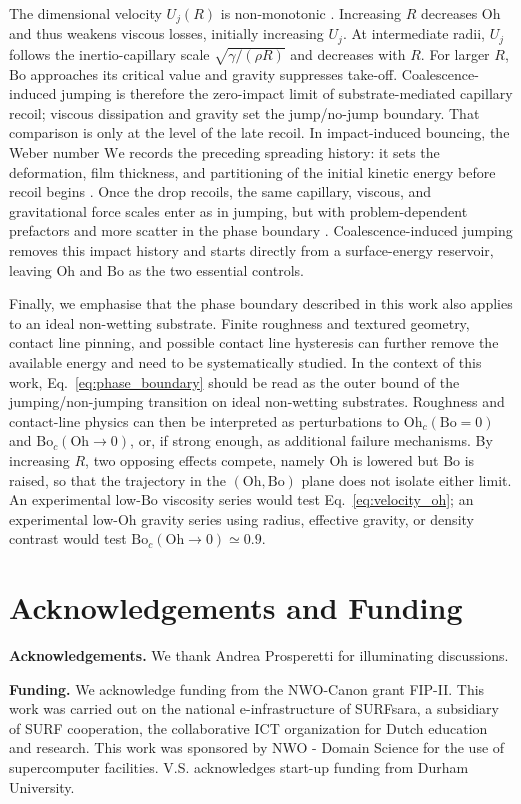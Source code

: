 \documentclass[
reprint,
amsmath,amssymb,
superscriptaddress,
onecolumn,
aps,
prfluids,
longbibliography,
floatfix
]{revtex4-2}
\newcommand{\Oh}{\mathrm{Oh}}
\newcommand{\Bo}{\mathrm{Bo}}
\newcommand{\We}{\mathrm{We}}
\begin{document}
The dimensional velocity $U_j(R)$ is non-monotonic \cite{lecointre2019ballistics}. Increasing $R$ decreases $\Oh$ and thus weakens viscous losses, initially increasing $U_j$.
At intermediate radii, $U_j$ follows the inertio-capillary scale $\sqrt{\gamma/(\rho R)}$ and decreases with $R$.
For larger $R$, $\Bo$ approaches its critical value and gravity suppresses take-off.
Coalescence-induced jumping is therefore the zero-impact limit of substrate-mediated capillary recoil; viscous dissipation and gravity set the jump/no-jump boundary.
That comparison is only at the level of the late recoil. In impact-induced bouncing, the Weber number $\We$ records the preceding spreading history: it sets the deformation, film thickness, and partitioning of the initial kinetic energy before recoil begins \cite{sanjay2025unifying}. Once the drop recoils, the same capillary, viscous, and gravitational force scales enter as in jumping, but with problem-dependent prefactors and more scatter in the phase boundary \cite{sanjay2023bouncing}. Coalescence-induced jumping removes this impact history and starts directly from a surface-energy reservoir, leaving $\Oh$ and $\Bo$ as the two essential controls.

Finally, we emphasise that the phase boundary described in this work also applies to an ideal non-wetting substrate.
Finite roughness and textured geometry, contact line pinning, and possible contact line hysteresis can further remove the available energy and need to be systematically studied.
In the context of this work, Eq.~\eqref{eq:phase_boundary} should be read as the outer bound of the jumping/non-jumping transition on ideal non-wetting substrates.
Roughness and contact-line physics can then be interpreted as perturbations to $\Oh_c(\Bo=0)$ and $\Bo_c(\Oh\to 0)$, or, if strong enough, as additional failure mechanisms.
By increasing $R$, two opposing effects compete, namely $\Oh$ is lowered but $\Bo$ is raised, so that the trajectory in the $(\Oh,\Bo)$ plane does not isolate either limit.
An experimental low-$\Bo$ viscosity series would test Eq.~\eqref{eq:velocity_oh}; an experimental low-$\Oh$ gravity series using radius, effective gravity, or density contrast would test $\Bo_c(\Oh\to 0)\simeq0.9$.


\section*{Acknowledgements and Funding}
\noindent\textbf{Acknowledgements.} We thank Andrea Prosperetti for illuminating discussions.

\noindent\textbf{Funding.} We acknowledge funding from the NWO-Canon grant FIP-II. This work was carried out on the national e-infrastructure of SURFsara, a subsidiary of SURF cooperation, the collaborative ICT organization for Dutch education and research. This work was sponsored by NWO - Domain Science for the use of supercomputer facilities. V.S. acknowledges start-up funding from Durham University.



\end{document}
